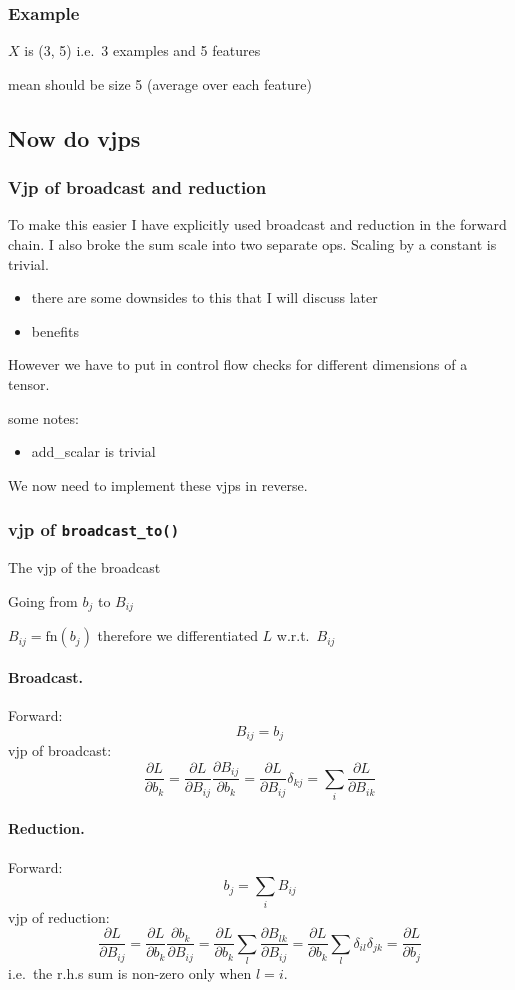 \documentclass[11pt]{article}
\newcommand{\pd}[2]{\frac{\partial #1}{\partial #2}}
\begin{document}
\subsubsection*{Example}

$X$ is (3, 5) i.e.\ 3 examples and 5 features

mean should be size 5 (average over each feature)

\subsection{Now do vjps}

\subsubsection*{Vjp of broadcast and reduction}
To make this easier I have explicitly used broadcast and reduction in the
forward chain. I also broke the sum scale into two separate ops. Scaling by a
constant is trivial.
\begin{itemize}
  \item there are some downsides to this that I will discuss later
  \item benefits
\end{itemize}
However we have to put in control flow checks for different dimensions of a
tensor.

some notes:
\begin{itemize}
  \item add\_scalar is trivial
\end{itemize}

We now need to implement these vjps in reverse.

\subsubsection*{vjp of \texttt{broadcast\_to()}}
The vjp of the broadcast

Going from $b_j$ to $B_{ij}$

$B_{ij} = \mathrm{fn}(b_j)$ therefore we differentiated $L$ w.r.t.\ $B_{ij}$

\paragraph{Broadcast.} Forward:
\[
B_{ij} = b_j
\]
vjp of broadcast:
\[
\pd{L}{b_k} = \pd{L}{B_{ij}} \pd{B_{ij}}{b_k} = \pd{L}{B_{ij}}\delta_{kj} = \sum_i \pd{L}{B_{ik}}
\]

\paragraph{Reduction.} Forward:
\[
b_j = \sum_i B_{ij}
\]
vjp of reduction:
\[
\pd{L}{B_{ij}} = \pd{L}{b_k} \pd{b_{k}}{B_{ij}} = \pd{L}{b_k}\sum_l \pd{B_{lk}}{B_{ij}} = \pd{L}{b_k}\sum_l \delta_{il} \delta_{jk} = \pd{L}{b_j}
\]
i.e.\ the r.h.s sum is non-zero only when $l = i$.
\end{document}
